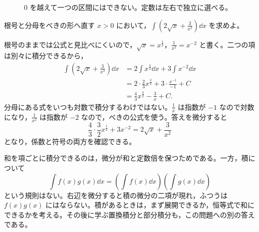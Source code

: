 \begin{figure}[htbp]
 \centering
 \caption{$0$ を越えて一つの区間にはできない。定数は左右で独立に選べる。}
 \label{図:対数の区間}
\end{figure}

\begin{example}{根号と分母をべきの形へ直す}
$x>0$ において，$\int\left(2\sqrt{x}+\frac3{x^2}\right)\dd x$ を求めよ。
\end{example}

根号のままでは公式と見比べにくいので，$\sqrt{x}=x^{\frac12}$，$\frac1{x^2}=x^{-2}$ と書く。二つの項は別々に積分できるから，
\[
\begin{aligned}
 \int\left(2\sqrt{x}+\frac3{x^2}\right)\dd x
 &=2\int x^{\frac12}\dd x+3\int x^{-2}\dd x\\
 &=2\cdot\frac23x^{\frac32}
   +3\cdot\frac{x^{-1}}{-1}+C\\
 &=\frac43x^{\frac32}-\frac3x+C.
\end{aligned}
\]
分母にある式をいつも対数で積分するわけではない。$\frac1x$ は指数が $-1$ なので対数になり，$\frac1{x^2}$ は指数が $-2$ なので，べきの公式を使う。答えを微分すると
\[
 \frac43\cdot\frac32x^{\frac12}
 +3x^{-2}=2\sqrt{x}+\frac3{x^2}
\]
となり，係数と符号の両方を確認できる。

和を項ごとに積分できるのは，微分が和と定数倍を保つためである。一方，積について
\[
 \int f(x)g(x)\dd x
 =\left(\int f(x)\dd x\right)
  \left(\int g(x)\dd x\right)
\]
という規則はない。右辺を微分すると積の微分の二項が現れ，ふつうは $f(x)g(x)$ にはならない。積があるときは，まず展開できるか，恒等式で和にできるかを考える。その後に学ぶ置換積分と部分積分も，この問題への別の答えである。

